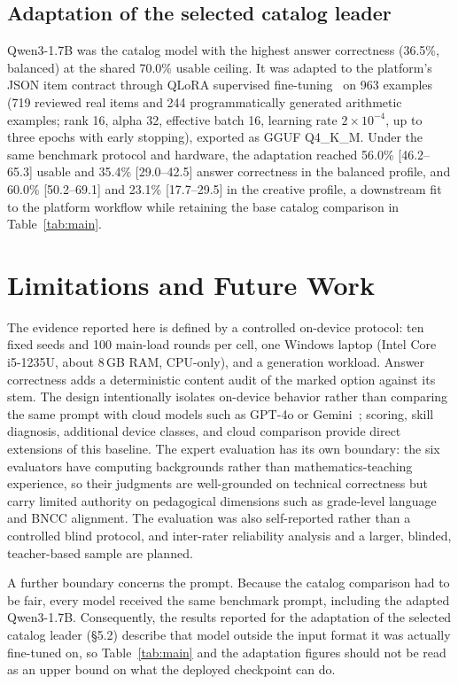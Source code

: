 \documentclass[fleqn,10pt]{JLA_article}
\begin{document}
\subsection{Adaptation of the selected catalog leader}
Qwen3-1.7B was the catalog model with the highest answer correctness (36.5\%, balanced) at the shared 70.0\% usable ceiling. It was adapted to the platform's JSON item contract through QLoRA supervised fine-tuning~\autocite{dettmers2023qlora} on 963 examples (719 reviewed real items and 244 programmatically generated arithmetic examples; rank 16, alpha 32, effective batch 16, learning rate $2\times10^{-4}$, up to three epochs with early stopping), exported as GGUF Q4\_K\_M. Under the same benchmark protocol and hardware, the adaptation reached 56.0\% [46.2--65.3] usable and 35.4\% [29.0--42.5] answer correctness in the balanced profile, and 60.0\% [50.2--69.1] and 23.1\% [17.7--29.5] in the creative profile, a downstream fit to the platform workflow while retaining the base catalog comparison in Table~\ref{tab:main}.
\section{Limitations and Future Work}
The evidence reported here is defined by a controlled on-device protocol: ten fixed seeds and 100 main-load rounds per cell, one Windows laptop (Intel Core i5-1235U, about 8\,GB RAM, CPU-only), and a generation workload. Answer correctness adds a deterministic content audit of the marked option against its stem. The design intentionally isolates on-device behavior rather than comparing the same prompt with cloud models such as GPT-4o or Gemini~\autocite{lobo2025scoring}; scoring, skill diagnosis, additional device classes, and cloud comparison provide direct extensions of this baseline. The expert evaluation has its own boundary: the six evaluators have computing backgrounds rather than mathematics-teaching experience, so their judgments are well-grounded on technical correctness but carry limited authority on pedagogical dimensions such as grade-level language and BNCC alignment. The evaluation was also self-reported rather than a controlled blind protocol, and inter-rater reliability analysis and a larger, blinded, teacher-based sample are planned.

A further boundary concerns the prompt. Because the catalog comparison had to be fair, every model received the same benchmark prompt, including the adapted Qwen3-1.7B. Consequently, the results reported for the adaptation of the selected catalog leader (\S5.2) describe that model outside the input format it was actually fine-tuned on, so Table~\ref{tab:main} and the adaptation figures should not be read as an upper bound on what the deployed checkpoint can do.
\end{document}

